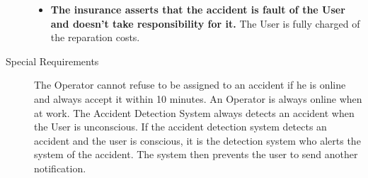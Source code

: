 \begin{description}
\begin{itemize}
				\item \textbf{The insurance asserts that the accident is fault of the User and doesn't take responsibility for it.} The User is fully charged of the reparation costs.
			\end{itemize}
			\item[Special Requirements] The Operator cannot refuse to be assigned to an accident if he is online and always accept it within 10 minutes. An Operator is always online when at work.
			The Accident Detection System always detects an accident when the User is unconscious. If the accident detection system detects an accident and the user is conscious, it is the detection system who alerts the system of the accident. The system then prevents the user to send another notification. 
		\end{description}

